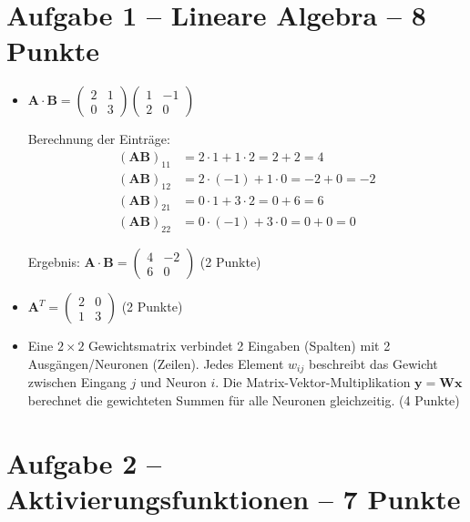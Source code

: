 \section*{Aufgabe 1 -- Lineare Algebra -- 8 Punkte}

\begin{itemize}
\item [a)] $\mathbf{A} \cdot \mathbf{B} = \begin{pmatrix} 2 & 1 \\ 0 & 3 \end{pmatrix} \begin{pmatrix} 1 & -1 \\ 2 & 0 \end{pmatrix}$

Berechnung der Einträge:
\begin{align*}
(\mathbf{AB})_{11} &= 2 \cdot 1 + 1 \cdot 2 = 2 + 2 = 4 \\
(\mathbf{AB})_{12} &= 2 \cdot (-1) + 1 \cdot 0 = -2 + 0 = -2 \\
(\mathbf{AB})_{21} &= 0 \cdot 1 + 3 \cdot 2 = 0 + 6 = 6 \\
(\mathbf{AB})_{22} &= 0 \cdot (-1) + 3 \cdot 0 = 0 + 0 = 0
\end{align*}

Ergebnis: $\mathbf{A} \cdot \mathbf{B} = \begin{pmatrix} 4 & -2 \\ 6 & 0 \end{pmatrix}$ (2 Punkte)
\end{itemize}

\begin{itemize}
\item [b)] $\mathbf{A}^T = \begin{pmatrix} 2 & 0 \\ 1 & 3 \end{pmatrix}$ (2 Punkte)
\end{itemize}

\begin{itemize}
\item [c)] Eine $2 \times 2$ Gewichtsmatrix verbindet 2 Eingaben (Spalten) mit 2 Ausgängen/Neuronen (Zeilen). Jedes Element $w_{ij}$ beschreibt das Gewicht zwischen Eingang $j$ und Neuron $i$. Die Matrix-Vektor-Multiplikation $\mathbf{y} = \mathbf{W} \mathbf{x}$ berechnet die gewichteten Summen für alle Neuronen gleichzeitig. (4 Punkte)
\end{itemize}

\newpage

\section*{Aufgabe 2 -- Aktivierungsfunktionen -- 7 Punkte}

